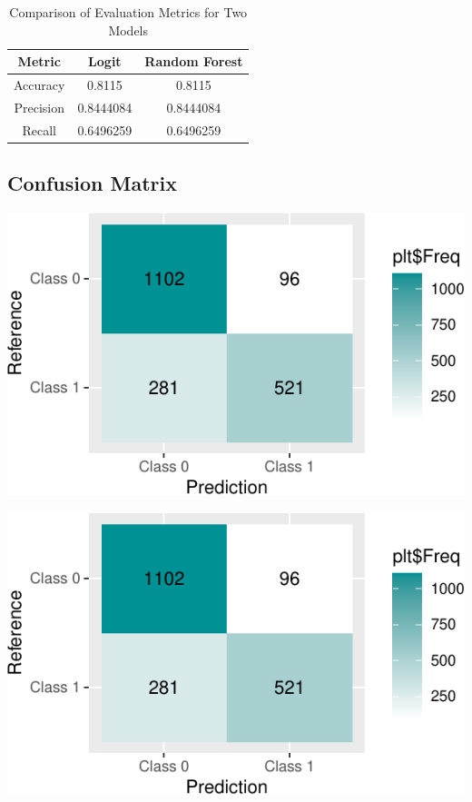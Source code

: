 \documentclass{article}
\begin{document}
\begin{table}[h]
\centering
\begin{tabular}{|c|c|c|}
\hline
\textbf{Metric} & \textbf{Logit} & \textbf{Random Forest} \\
\hline
Accuracy & 0.8115 & 0.8115 \\
Precision & 0.8444084 & 0.8444084 \\
Recall & 0.6496259 & 0.6496259 \\
\hline
\end{tabular}
\caption{Comparison of Evaluation Metrics for Two Models}
\label{tab:comparison}
\end{table}

\hypertarget{confusion-matrix}{%
\subsection{Confusion Matrix}\label{confusion-matrix}}

\includegraphics{report_files/figure-latex/unnamed-chunk-16-1.pdf}

\includegraphics{report_files/figure-latex/unnamed-chunk-17-1.pdf}
\end{document}
